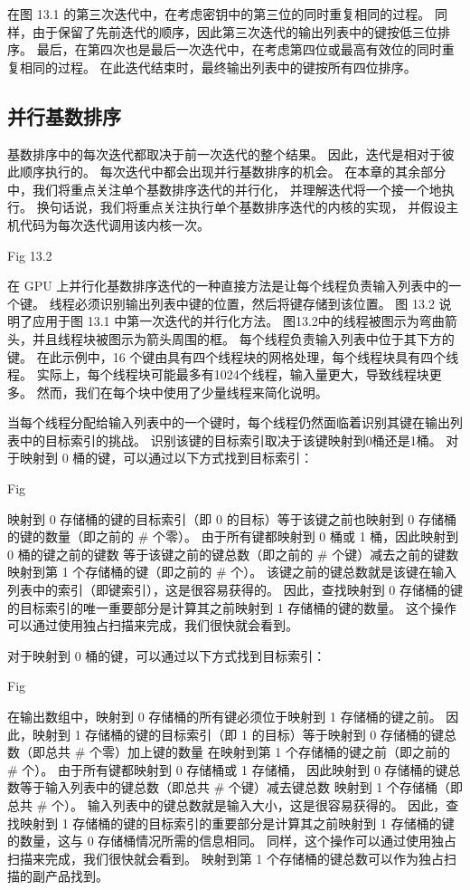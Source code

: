 在图 13.1 的第三次迭代中，在考虑密钥中的第三位的同时重复相同的过程。 
同样，由于保留了先前迭代的顺序，因此第三次迭代的输出列表中的键按低三位排序。 
最后，在第四次也是最后一次迭代中，在考虑第四位或最高有效位的同时重复相同的过程。 
在此迭代结束时，最终输出列表中的键按所有四位排序。

\subsection{并行基数排序}
基数排序中的每次迭代都取决于前一次迭代的整个结果。 因此，迭代是相对于彼此顺序执行的。 
每次迭代中都会出现并行基数排序的机会。 在本章的其余部分中，我们将重点关注单个基数排序迭代的并行化，
并理解迭代将一个接一个地执行。 换句话说，我们将重点关注执行单个基数排序迭代的内核的实现，
并假设主机代码为每次迭代调用该内核一次。

{\color{red} Fig 13.2}

在 GPU 上并行化基数排序迭代的一种直接方法是让每个线程负责输入列表中的一个键。 
线程必须识别输出列表中键的位置，然后将键存储到该位置。 图 13.2 说明了应用于图 13.1 中第一次迭代的并行化方法。 
图13.2中的线程被图示为弯曲箭头，并且线程块被图示为箭头周围的框。 每个线程负责输入列表中位于其下方的键。 
在此示例中，16 个键由具有四个线程块的网格处理，每个线程块具有四个线程。 
实际上，每个线程块可能最多有1024个线程，输入量更大，导致线程块更多。 然而，我们在每个块中使用了少量线程来简化说明。

当每个线程分配给输入列表中的一个键时，每个线程仍然面临着识别其键在输出列表中的目标索引的挑战。 
识别该键的目标索引取决于该键映射到0桶还是1桶。 对于映射到 0 桶的键，可以通过以下方式找到目标索引：

{\color{red} Fig}

映射到 0 存储桶的键的目标索引（即 0 的目标）等于该键之前也映射到 0 存储桶的键的数量（即之前的 \# 个零）。 
由于所有键都映射到 0 桶或 1 桶，因此映射到 0 桶的键之前的键数
等于该键之前的键总数（即之前的 \# 个键）减去之前的键数 映射到第 1 个存储桶的键（即之前的 \# 个）。 
该键之前的键总数就是该键在输入列表中的索引（即键索引），这是很容易获得的。 
因此，查找映射到 0 存储桶的键的目标索引的唯一重要部分是计算其之前映射到 1 存储桶的键的数量。 
这个操作可以通过使用独占扫描来完成，我们很快就会看到。

对于映射到 0 桶的键，可以通过以下方式找到目标索引：

{\color{red} Fig}

在输出数组中，映射到 0 存储桶的所有键必须位于映射到 1 存储桶的键之前。 
因此，映射到 1 存储桶的键的目标索引（即 1 的目标）等于映射到 0 存储桶的键总数（即总共 \# 个零）加上键的数量 在映射到第 1 个存储桶的键之前（即之前的 \# 个）。 
由于所有键都映射到 0 存储桶或 1 存储桶，
因此映射到 0 存储桶的键总数等于输入列表中的键总数（即总共 \# 个键）减去键总数 映射到 1 个存储桶（即总共 \# 个）。 
输入列表中的键总数就是输入大小，这是很容易获得的。 
因此，查找映射到 1 存储桶的键的目标索引的重要部分是计算其之前映射到 1 存储桶的键的数量，这与 0 存储桶情况所需的信息相同。 
同样，这个操作可以通过使用独占扫描来完成，我们很快就会看到。 映射到第 1 个存储桶的键总数可以作为独占扫描的副产品找到。

